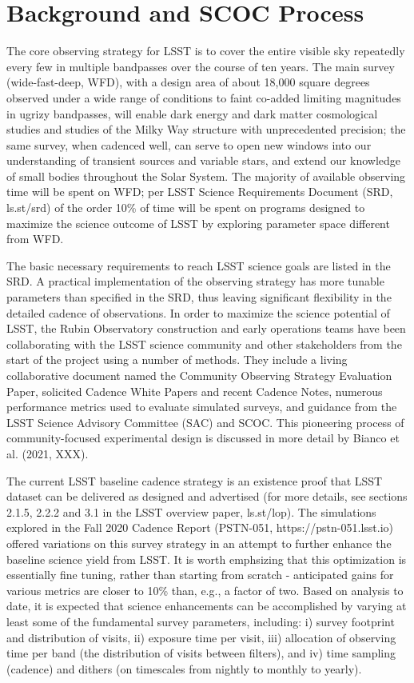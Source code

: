 \section{Background and SCOC Process}

The core observing strategy for LSST is to cover the entire visible sky repeatedly every few  
in multiple bandpasses over the course of ten years. The main survey (wide-fast-deep, WFD), with a design area of about 18,000 square degrees observed under a wide range of conditions to faint co-added limiting magnitudes in ugrizy bandpasses, will enable dark energy and dark matter cosmological studies and studies of the Milky Way structure with unprecedented precision; the same survey, when cadenced well, can serve to open new windows into our understanding of transient sources and variable stars, and extend our knowledge of small bodies throughout the Solar System. The majority of available observing time will be spent on WFD; per LSST Science Requirements Document (SRD, ls.st/srd) of the order 10\% of time will be spent on programs designed to maximize the science outcome of LSST by exploring parameter space different from WFD. 

The basic necessary requirements to reach LSST science goals are listed in the SRD. A 
practical implementation of the observing strategy has more tunable parameters than specified in the SRD, thus leaving significant flexibility in the detailed cadence of observations. In order to maximize the science potential of LSST, the Rubin Observatory construction and early operations teams have been collaborating with the LSST science community and other stakeholders from the start of the project using a number of methods. They include a living collaborative document named the Community Observing Strategy Evaluation Paper, solicited Cadence White Papers and recent Cadence Notes, numerous performance metrics used to evaluate simulated surveys, and guidance from the LSST Science Advisory Committee (SAC) and SCOC. This pioneering process of community-focused experimental design is discussed in more detail by Bianco et al. (2021, XXX). 

The current LSST baseline cadence strategy is an existence proof that LSST dataset can be 
delivered as designed and advertised (for more details, see sections 2.1.5, 2.2.2 and 3.1 in the LSST overview paper, ls.st/lop). The simulations explored in the Fall 2020 Cadence Report 
(PSTN-051, https://pstn-051.lsst.io) offered variations on this survey strategy in an attempt 
to further enhance the baseline science yield from LSST. It is worth emphsizing that this 
optimization is essentially fine tuning, rather than starting from scratch - anticipated gains
for various metrics are closer to 10\% than, e.g., a factor of two. Based on analysis to date, it is 
expected that science enhancements can be accomplished by varying at least some of the 
fundamental survey parameters, including: i) survey footprint and distribution of visits, 
ii) exposure time per visit, iii) allocation of observing time per band (the distribution of visits 
between filters), and iv) time sampling (cadence) and dithers (on timescales from nightly to 
monthly to yearly). 

